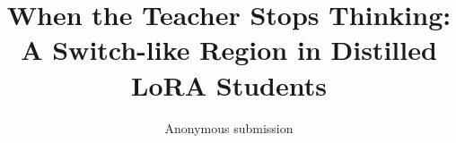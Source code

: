 \documentclass[11pt]{article}
\title{When the Teacher Stops Thinking: A Switch-like Region in Distilled LoRA Students}
\author{Anonymous submission}
\begin{document}
\maketitle

\begin{abstract}

\end{abstract}












\appendix

\end{document}
